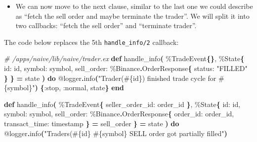 \documentclass[
  oneside]{book}
\newenvironment{Shaded}{\begin{snugshade}}{\end{snugshade}}
\newcommand{\CommentTok}[1]{\textcolor[rgb]{0.56,0.35,0.01}{\textit{#1}}}
\newcommand{\ConstantTok}[1]{\textcolor[rgb]{0.56,0.35,0.01}{#1}}
\newcommand{\FunctionTok}[1]{\textcolor[rgb]{0.13,0.29,0.53}{\textbf{#1}}}
\newcommand{\KeywordTok}[1]{\textcolor[rgb]{0.13,0.29,0.53}{\textbf{#1}}}
\newcommand{\NormalTok}[1]{#1}
\newcommand{\OperatorTok}[1]{\textcolor[rgb]{0.81,0.36,0.00}{\textbf{#1}}}
\newcommand{\OtherTok}[1]{\textcolor[rgb]{0.56,0.35,0.01}{#1}}
\newcommand{\StringTok}[1]{\textcolor[rgb]{0.31,0.60,0.02}{#1}}
\newcommand{\VariableTok}[1]{\textcolor[rgb]{0.00,0.00,0.00}{#1}}
\providecommand{\tightlist}{%
  \setlength{\itemsep}{0pt}\setlength{\parskip}{0pt}}
\begin{document}
\begin{itemize}
\tightlist
\item
  We can now move to the next clause, similar to the last one we could describe as ``fetch the sell order and maybe terminate the trader''. We will split it into two callbacks: ``fetch the sell order'' and ``terminate trader''.
\end{itemize}

\newpage

The code below replaces the 5th \texttt{handle\_info/2} callback:

\begin{Shaded}
\begin{Highlighting}[]
\CommentTok{\# /apps/naive/lib/naive/trader.ex}
  \KeywordTok{def}\NormalTok{ handle\_info}\FunctionTok{(}
\NormalTok{        \%}\ConstantTok{TradeEvent}\FunctionTok{\{\}}\NormalTok{,}
\NormalTok{        \%}\ConstantTok{State}\FunctionTok{\{}
          \VariableTok{id:}\NormalTok{ id,}
          \VariableTok{symbol:}\NormalTok{ symbol,}
          \VariableTok{sell\_order:}\NormalTok{ \%}\ConstantTok{Binance}\OperatorTok{.}\ConstantTok{OrderResponse}\FunctionTok{\{}
            \VariableTok{status:} \StringTok{"FILLED"}
          \FunctionTok{\}}
        \FunctionTok{\}} \OperatorTok{=}\NormalTok{ state}
      \FunctionTok{)} \KeywordTok{do}
    \OtherTok{@logger}\OperatorTok{.}\NormalTok{info}\FunctionTok{(}\StringTok{"Trader(}\OtherTok{\#\{}\NormalTok{id}\OtherTok{\}}\StringTok{) finished trade cycle for }\OtherTok{\#\{}\NormalTok{symbol}\OtherTok{\}}\StringTok{"}\FunctionTok{)}
    \FunctionTok{\{}\VariableTok{:stop}\NormalTok{, }\VariableTok{:normal}\NormalTok{, state}\FunctionTok{\}}
  \KeywordTok{end}

  \KeywordTok{def}\NormalTok{ handle\_info}\FunctionTok{(}
\NormalTok{        \%}\ConstantTok{TradeEvent}\FunctionTok{\{}
          \VariableTok{seller\_order\_id:}\NormalTok{ order\_id}
        \FunctionTok{\}}\NormalTok{,}
\NormalTok{        \%}\ConstantTok{State}\FunctionTok{\{}
          \VariableTok{id:}\NormalTok{ id,}
          \VariableTok{symbol:}\NormalTok{ symbol,}
          \VariableTok{sell\_order:}
\NormalTok{            \%}\ConstantTok{Binance}\OperatorTok{.}\ConstantTok{OrderResponse}\FunctionTok{\{}
              \VariableTok{order\_id:}\NormalTok{ order\_id,}
              \VariableTok{transact\_time:}\NormalTok{ timestamp}
            \FunctionTok{\}} \OperatorTok{=}\NormalTok{ sell\_order}
        \FunctionTok{\}} \OperatorTok{=}\NormalTok{ state}
      \FunctionTok{)} \KeywordTok{do}
    \OtherTok{@logger}\OperatorTok{.}\NormalTok{info}\FunctionTok{(}\StringTok{"Trader\textquotesingle{}s(}\OtherTok{\#\{}\NormalTok{id}\OtherTok{\}}\StringTok{ }\OtherTok{\#\{}\NormalTok{symbol}\OtherTok{\}}\StringTok{ SELL order got partially filled"}\FunctionTok{)}


\end{Highlighting}
\end{Shaded}
\end{document}
